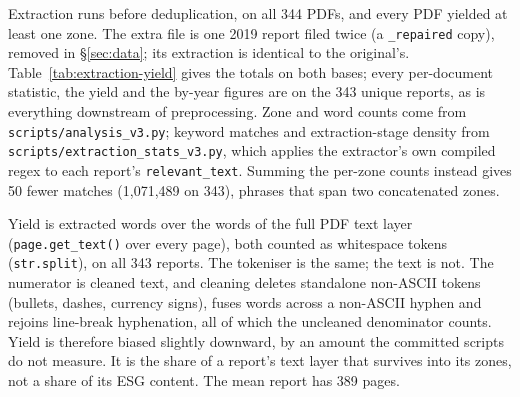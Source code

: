 Extraction runs before deduplication, on all 344 PDFs, and every PDF yielded
at least one zone. The extra file is one 2019 report filed twice (a
\texttt{\_repaired} copy), removed in \S\ref{sec:data}; its extraction is
identical to the original's. Table~\ref{tab:extraction-yield} gives the
totals on both bases; every per-document statistic, the yield and the
by-year figures are on the 343 unique reports, as is everything downstream of
preprocessing. Zone and word counts come from \texttt{scripts/analysis\_v3.py};
keyword matches and extraction-stage density from
\texttt{scripts/extraction\_stats\_v3.py}, which applies the extractor's own
compiled regex to each report's \texttt{relevant\_text}. Summing the
per-zone counts instead gives 50 fewer matches (1,071,489 on 343), phrases
that span two concatenated zones.

Yield is extracted words over the words of the full PDF text layer
(\texttt{page.get\_text()} over every page), both counted as whitespace
tokens (\texttt{str.split}), on all 343 reports. The tokeniser is the same;
the text is not. The numerator is cleaned text, and cleaning deletes
standalone non-ASCII tokens (bullets, dashes, currency signs), fuses words
across a non-ASCII hyphen and rejoins line-break hyphenation, all of which
the uncleaned denominator counts. Yield is therefore biased slightly
downward, by an amount the committed scripts do not measure. It is the share
of a report's text layer that survives into its zones, not a share of its
ESG content. The mean report has 389 pages.

